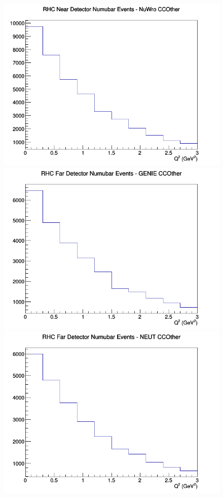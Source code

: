 \documentclass[12pt]{article}
\begin{document}
\begin{figure}[h]
\includegraphics[width=\linewidth]{eff_Q2/LAr/CCOther_RHC_ND_numubar_Q2_NuWro.png}
\endminipage
\newline
{}
\includegraphics[width=\linewidth]{eff_Q2/LAr/CCOther_RHC_FD_numubar_Q2_GENIE.png}
\endminipage
{}
\includegraphics[width=\linewidth]{eff_Q2/LAr/CCOther_RHC_FD_numubar_Q2_NEUT.png}

\end{figure}
\end{document}
